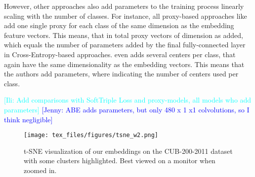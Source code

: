 \documentclass{article}
\newcommand{\jenny}[1]{{\textcolor{blue}{[Jenny: #1]}}}
\newcommand{\ili}[1]{{\textcolor{cyan}{[Ili: #1]}}}
\begin{document}
However, other approaches also add parameters to the training process linearly scaling with the number of classes. For instance, all proxy-based approaches like \cite{DBLP:journals/corr/abs-2004-01113,DBLP:conf/cvpr/KimKCK20} add one single proxy for each class of the same dimension as the embedding feature vectors. This means, that in total  proxy vectors of dimension  as added, which equals the number of parameters added by the final fully-connected layer in Cross-Entropy-based approaches. 
\cite{DBLP:conf/iccv/QianSSHTLJ19} even adds several centers per class, that again have the same dimensionality as the embedding vectors. This means that the authors add  parameters, where  indicating the number of centers used per class.

\ili{Add comparisons with SoftTriple Loss and proxy-models, all models who add parameters} \jenny{ABE adds parameters, but only 480 x 1 x1 colvolutions, so I think negligible}
\fi



\begin{figure*}
    \begin{center}
    \centerline{\texttt{[image: tex\_files/figures/tsne\_w2.png]}}
    \caption{ t-SNE \cite{DBLP:journals/ml/MaatenH12} visualization of our  embeddings on the CUB-200-2011 \cite{WahCUB_200_2011} dataset with some clusters highlighted. Best viewed on a monitor when zoomed in.}
    \label{fig:tsne}
    \end{center}
\end{figure*}

\clearpage 
\clearpage


\end{document}
